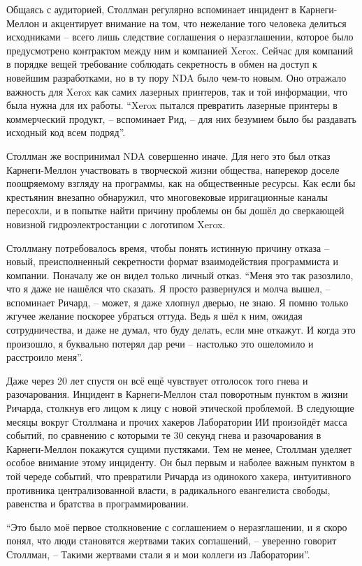 Общаясь с аудиторией, Столлман регулярно вспоминает инцидент в Карнеги-Меллон и акцентирует внимание на том, что нежелание того человека делиться исходниками -- всего лишь следствие соглашения о неразглашении, которое было предусмотрено контрактом между ним и компанией Xerox. Сейчас для компаний в порядке вещей требование соблюдать секретность в обмен на доступ к новейшим разработками, но в ту пору NDA было чем-то новым. Оно отражало важность для Xerox как самих лазерных принтеров, так и той информации, что была нужна для их работы. ``Xerox пытался превратить лазерные принтеры в коммерческий продукт, -- вспоминает Рид, -- для них безумием было бы раздавать исходный код всем подряд''.

Столлман же воспринимал NDA совершенно иначе. Для него это был отказ Карнеги-Меллон участвовать в творческой жизни общества, наперекор доселе поощряемому взгляду на программы, как на общественные ресурсы. Как если бы крестьянин внезапно обнаружил, что многовековые ирригационные каналы пересохли, и в попытке найти причину проблемы он бы дошёл до сверкающей новизной гидроэлектростанции с логотипом Xerox.

Столлману потребовалось время, чтобы понять истинную причину отказа -- новый, преисполненный секретности формат взаимодействия программиста и компании. Поначалу же он видел только личный отказ. ``Меня это так разозлило, что я даже не нашёлся что сказать. Я просто развернулся и молча вышел, -- вспоминает Ричард, -- может, я даже хлопнул дверью, не знаю. Я помню только жгучее желание поскорее убраться оттуда. Ведь я шёл к ним, ожидая сотрудничества, и даже не думал, что буду делать, если мне откажут. И когда это произошло, я буквально потерял дар речи -- настолько это ошеломило и расстроило меня''.

Даже через 20 лет спустя он всё ещё чувствует отголосок того гнева и разочарования. Инцидент в Карнеги-Меллон стал поворотным пунктом в жизни Ричарда, столкнув его лицом к лицу с новой этической проблемой. В следующие месяцы вокруг Столлмана и прочих хакеров Лаборатории ИИ произойдёт масса событий, по сравнению с которыми те 30 секунд гнева и разочарования в Карнеги-Меллон покажутся сущими пустяками. Тем не менее, Столлман уделяет особое внимание этому инциденту. Он был первым и наболее важным пунктом в той череде событий, что превратили Ричарда из одинокого хакера, интуитивного противника централизованной власти, в радикального евангелиста свободы, равенства и братства в программировании.

``Это было моё первое столкновение с соглашением о неразглашении, и я скоро понял, что люди становятся жертвами таких соглашений, -- уверенно говорит Столлман, --  Такими жертвами стали я и мои коллеги из Лаборатории''.

